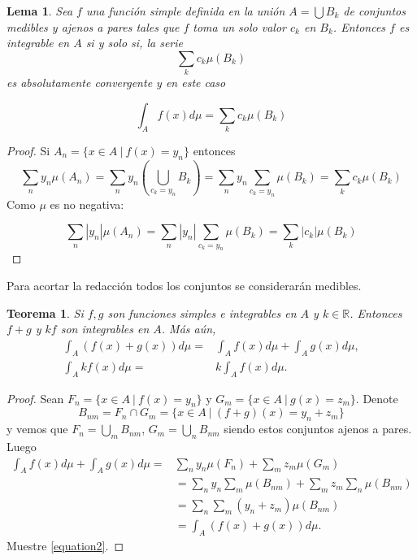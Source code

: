 \documentclass[twoside,12pt,a4 paper,openright]{book}
\newtheorem{teo}[claim]{Teorema}
\newtheorem{lem}[claim]{Lema}
\begin{document}
\begin{lem}\label{lemasuma}
    Sea $f$ una funci\'on simple definida en la uni\'on $A = \bigcup B_k$ de conjuntos medibles y ajenos a pares tales que $f$ toma un solo valor $c_k$ en $B_k$. Entonces $f$ es integrable en $A$ si y solo si, la serie
    $$\sum_{k}c_k\mu(B_k)$$
    es absolutamente convergente y en este caso 

    $$\int_A f(x)d\mu = \sum_k c_k \mu(B_k)$$
\end{lem}
\begin{proof}
    Si $A_n = \{x\in A \ | \ f(x) = y_n\}$ entonces 
    $$\displaystyle\sum_n y_n\mu(A_n) = \sum_n y_n\left(\bigcup_{c_k = y_n}B_k \right) = \sum_n y_n \sum_{c_k = y_n} \mu(B_k) = \sum_k c_k\mu(B_k)$$
    Como $\mu$ es no negativa:

    $$\sum_n |y_n| \mu(A_n) = \sum_n |y_n|\sum_{c_k = y_n}\mu(B_k) = \sum_k |c_k| \mu(B_k)$$
\end{proof}     
Para acortar la redacci\'on todos los conjuntos se considerar\'an medibles.
\begin{teo}
    Si $f,g$ son funciones simples e integrables en $A$ y $k\in \mathbb{R}$. Entonces $f + g$ y $kf$ son integrables en $A$.  M\'as a\'un, 
   \begin{align}
   \int_A( f(x) + g(x))d\mu = &  \int_A f(x)d\mu + \int_A g(x)d\mu  \label{equation1}, \\ 
     \int_A kf(x)d\mu  = &  k\int_A f(x)d\mu  . \label{equation2}
\end{align}
\end{teo}
 
\begin{proof}
    Sean $F_n = \{x\in A \ | \  f(x) = y_n\}$ y  $G_m = \{x \in A \ | \ g(x) = z_m\}$. Denote 
     $$B_{nm} = F_n\cap G_m = \{x\in A\ | \ (f + g)(x) = y_n + z_m\}$$
    y vemos que 
     $\displaystyle F_n =\bigcup_{m}B_{nm} $, $\displaystyle G_m =\bigcup_{n}B_{nm} $ siendo estos conjuntos ajenos a pares. Luego
    \begin{align*}
  \int_A f(x)d\mu + \int_A g(x) d\mu  = & \sum_n y_n\mu(F_n) + \sum_m z_m \mu(G_m) \\
        &= \sum_n y_n \sum_m \mu(B_{nm}) + \sum_m z_m \sum_n \mu(B_{nm})\\
        & = \sum_n\sum_m(y_n + z_m)\mu(B_{nm})\\
        & = \int_A ( f(x)  +  g(x) ) d\mu.
    \end{align*}
     Muestre \eqref{equation2}.
\end{proof}
\end{document}
